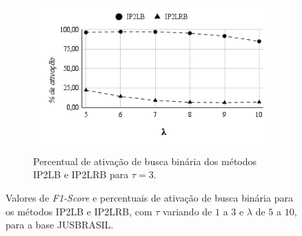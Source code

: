 \begin{figure}[h]
\begin{subfigure}[b]{0.49\textwidth}
        \includegraphics[width=\textwidth]{figures/binary-activation-tau-3.png}
        \caption{Percentual de ativação de busca binária dos métodos IP2LB e IP2LRB para $\tau=3$.}
        \label{fig:binary_activation_tau_3}
    \end{subfigure}
    \caption{Valores de \textit{F1-Score} e percentuais de ativação de busca binária para os métodos IP2LB e IP2LRB, com $\tau$ variando de $1$ a $3$ e $\lambda$ de $5$ a $10$, para a base JUSBRASIL.}
    \label{fig:f1_score_and_binary_activation}
\end{figure}


